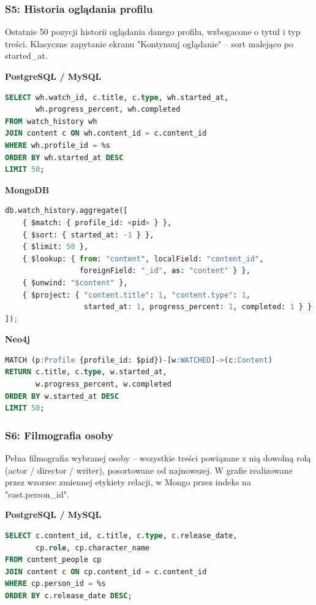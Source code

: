 \subsubsection{S5: Historia oglądania profilu}

Ostatnie 50 pozycji historii oglądania danego profilu, wzbogacone o tytuł i typ
treści. Klasyczne zapytanie ekranu "Kontynuuj oglądanie" -- sort malejąco
po started\_at.

\textbf{PostgreSQL / MySQL}
\begin{lstlisting}[language=SQL]
SELECT wh.watch_id, c.title, c.type, wh.started_at,
       wh.progress_percent, wh.completed
FROM watch_history wh
JOIN content c ON wh.content_id = c.content_id
WHERE wh.profile_id = %s
ORDER BY wh.started_at DESC
LIMIT 50;
\end{lstlisting}

\textbf{MongoDB}
\begin{lstlisting}[language=Python]
db.watch_history.aggregate([
    { $match: { profile_id: <pid> } },
    { $sort: { started_at: -1 } },
    { $limit: 50 },
    { $lookup: { from: "content", localField: "content_id",
                 foreignField: "_id", as: "content" } },
    { $unwind: "$content" },
    { $project: { "content.title": 1, "content.type": 1,
                  started_at: 1, progress_percent: 1, completed: 1 } }
]);
\end{lstlisting}

\textbf{Neo4j}
\begin{lstlisting}[language=SQL]
MATCH (p:Profile {profile_id: $pid})-[w:WATCHED]->(c:Content)
RETURN c.title, c.type, w.started_at,
       w.progress_percent, w.completed
ORDER BY w.started_at DESC
LIMIT 50;
\end{lstlisting}


\subsubsection{S6: Filmografia osoby}

Pełna filmografia wybranej osoby -- wszystkie treści powiązane z nią dowolną
rolą (actor / director / writer), posortowane od najnowszej. W grafie
realizowane przez wzorzec zmiennej etykiety relacji, w Mongo przez indeks
na "cast.person\_id".

\textbf{PostgreSQL / MySQL}
\begin{lstlisting}[language=SQL]
SELECT c.content_id, c.title, c.type, c.release_date,
       cp.role, cp.character_name
FROM content_people cp
JOIN content c ON cp.content_id = c.content_id
WHERE cp.person_id = %s
ORDER BY c.release_date DESC;
\end{lstlisting}

